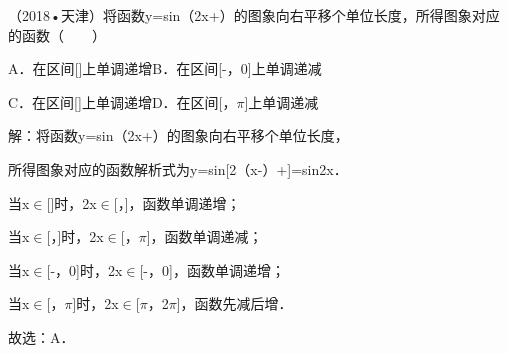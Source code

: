 \begin{question}
（2018•天津）将函数y=sin（2x+）的图象向右平移个单位长度，所得图象对应的函数（　　）\par
A．在区间[]上单调递增\qquad{}B．在区间[-，0]上单调递减\par
C．在区间[]上单调递增\qquad{}D．在区间[，\ensuremath{\pi}]上单调递减\par
\begin{solution}
解：将函数y=sin（2x+）的图象向右平移个单位长度，\par
所得图象对应的函数解析式为y=sin[2（x-）+]=sin2x．\par
当x\ensuremath{\in}[]时，2x\ensuremath{\in}[，]，函数单调递增；\par
当x\ensuremath{\in}[，]时，2x\ensuremath{\in}[，\ensuremath{\pi}]，函数单调递减；\par
当x\ensuremath{\in}[-，0]时，2x\ensuremath{\in}[-，0]，函数单调递增；\par
当x\ensuremath{\in}[，\ensuremath{\pi}]时，2x\ensuremath{\in}[\ensuremath{\pi}，2\ensuremath{\pi}]，函数先减后增．\par
故选：A．\par
\end{solution}
\end{question}

